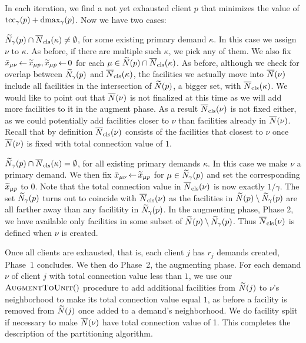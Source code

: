In each iteration, we find a not yet exhausted client $p$ that minimizes the
value of $\textrm{tcc}_\gamma(p) + \text{dmax}_\gamma(p)$. Now we have two cases:

\begin{description}

\item{} ${\widetilde N}_{\gamma}(p) \cap
  {\overline{N}}_{\text{cls}}(\kappa)\neq\emptyset$, for some existing primary demand
  $\kappa$.  In this case we assign $\nu$ to $\kappa$. As before, if
  there are multiple such $\kappa$, we pick any of them. We also fix
  ${\bar x}_{\mu \nu} {\,\leftarrow\,} {\widetilde x}_{\mu p}, {\widetilde x}_{\mu p}{\,\leftarrow\,} 0$
  for each $\mu \in {\widetilde N}(p)\cap {\overline{N}}_{\text{cls}}(\kappa)$. As before,
  although we check for overlap between ${\widetilde N}_{\gamma}(p)$ and
  ${\overline{N}}_{\text{cls}}(\kappa)$, the facilities we actually move into
  ${\overline{N}}(\nu)$ include all facilities in the intersection of
  ${\widetilde N}(p)$, a bigger set, with ${\overline{N}}_{\text{cls}}(\kappa)$. We would
  like to point out that ${\overline{N}}(\nu)$ is not finalized at this time
  as we will add more facilities to it in the augment phase. As a
  result ${\overline{N}}_{\text{cls}}(\nu)$ is not fixed either, as we could
  potentially add facilities closer to $\nu$ than facilities already
  in ${\overline{N}}(\nu)$. Recall that by definition ${\overline{N}}_{\text{cls}}(\nu)$
  consists of the facilities that closest to $\nu$ once ${\overline{N}}(\nu)$
  is fixed with total connection value of $1$.

\item{} ${\widetilde N}_{\gamma}(p) \cap {\overline{N}}_{\text{cls}}(\kappa) =
  \emptyset$, for all existing primary demands $\kappa$.  In this case
  we make $\nu$ a primary demand. We then fix ${\bar x}_{\mu \nu}{\,\leftarrow\,}
  {\widetilde x}_{\mu p}$ for $\mu \in {\widetilde N}_{\gamma}(p)$ and set the
  corresponding ${\widetilde x}_{\mu p}$ to $0$.  Note that the total
  connection value in ${\overline{N}}_{\text{cls}}(\nu)$ is now exactly $1/\gamma$.
  The set ${\widetilde N}_{\gamma}(p)$ turns out to coincide with
  ${\overline{N}}_{\text{cls}}(\nu)$ as the facilities in ${\widetilde N}(p) \setminus
  {\widetilde N}_{\gamma}(p)$ are all farther away than any facilitity in
  ${\widetilde N}_{\gamma}(p)$. In the augmenting phase, Phase 2, we have
  available only facilities in some subset of ${\widetilde N}(p) \setminus
  {\widetilde N}_{\gamma}(p)$. Thus ${\overline{N}}_{\text{cls}}(\nu)$ is defined when $\nu$
  is created.
\end{description}

Once all clients are exhausted, that is, each client $j$ has $r_j$
demands created, Phase~1 concludes. We then do Phase~2, the augmenting
phase.  For each demand $\nu$ of client $j$ with total connection
value less than $1$, we use our ${\textsc{AugmentToUnit}}()$ procedure to add
additional facilities from ${\widetilde N}(j)$ to $\nu$'s neighborhood to
make its total connection value equal $1$, as before a facility is
removed from ${\widetilde N}(j)$ once added to a demand's neighborhood. We
do facility split if necessary to make ${\overline{N}}(\nu)$ have total
connection value of 1.  This completes the description of the
partitioning algorithm.

